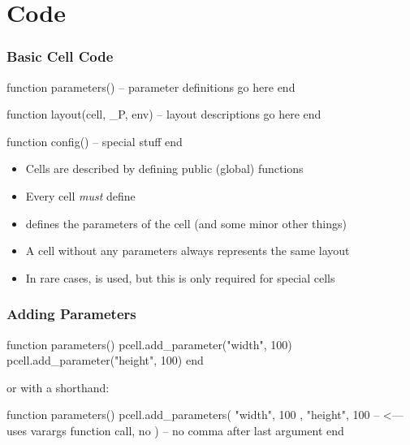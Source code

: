 \documentclass[aspectratio=169, dvipsnames, x11names, svgnames, 11pt]{beamer}
\begin{document}
\section{Code}
\begin{frame}[fragile]
    \centering
    \frametitle{Basic Cell Code}
    \begin{luacode}
        function parameters()
            -- parameter definitions go here
        end

        function layout(cell, _P, env)
            -- layout descriptions go here
        end

        function config()
            -- special stuff
        end
    \end{luacode}
    \vfill
    \begin{itemize}
        \item Cells are described by defining public (global) functions
        \item Every cell \emph{must} define 
        \item {} defines the parameters of the cell (and some minor other things)
        \item A cell without any parameters always represents the same layout
        \item In rare cases,  is used, but this is only required for special cells
    \end{itemize}
\end{frame}

\begin{frame}[fragile]
    \centering
    \frametitle{Adding Parameters}
    \begin{luacode}
        function parameters()
            pcell.add_parameter("width", 100)
            pcell.add_parameter("height", 100)
        end
    \end{luacode}
    \vfill

    or with a shorthand:
    \begin{luacode}
        function parameters()
            pcell.add_parameters({
                { "width", 100 },
                { "height", 100 } -- <--- uses varargs function call, no
            })                    --      no comma after last argument
        end
    \end{luacode}
\end{frame}
\end{document}
